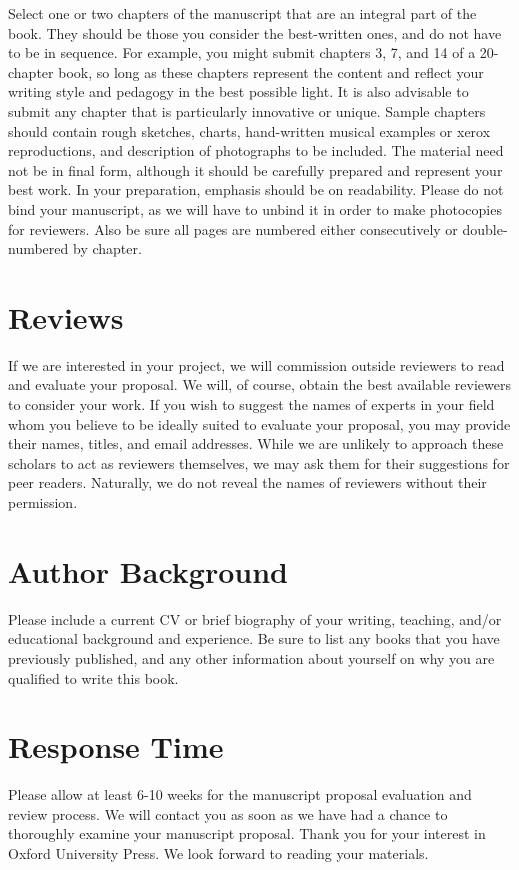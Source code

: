 \documentclass[
  10pt,
  dvipsnames,enabledeprecatedfontcommands]{scrartcl}
\begin{document}
Select one or two chapters of the manuscript that are an integral part
of the book. They should be those you consider the best-written ones,
and do not have to be in sequence. For example, you might submit
chapters 3, 7, and 14 of a 20-chapter book, so long as these chapters
represent the content and reflect your writing style and pedagogy in the
best possible light. It is also advisable to submit any chapter that is
particularly innovative or unique. Sample chapters should contain rough
sketches, charts, hand-written musical examples or xerox reproductions,
and description of photographs to be included. The material need not be
in final form, although it should be carefully prepared and represent
your best work. In your preparation, emphasis should be on readability.
Please do not bind your manuscript, as we will have to unbind it in
order to make photocopies for reviewers. Also be sure all pages are
numbered either consecutively or double-numbered by chapter.

\hypertarget{reviews}{%
\section{Reviews}\label{reviews}}

If we are interested in your project, we will commission outside
reviewers to read and evaluate your proposal. We will, of course, obtain
the best available reviewers to consider your work. If you wish to
suggest the names of experts in your field whom you believe to be
ideally suited to evaluate your proposal, you may provide their names,
titles, and email addresses. While we are unlikely to approach these
scholars to act as reviewers themselves, we may ask them for their
suggestions for peer readers. Naturally, we do not reveal the names of
reviewers without their permission.

\hypertarget{author-background}{%
\section{Author Background}\label{author-background}}

Please include a current CV or brief biography of your writing,
teaching, and/or educational background and experience. Be sure to list
any books that you have previously published, and any other information
about yourself on why you are qualified to write this book.

\hypertarget{response-time}{%
\section{Response Time}\label{response-time}}

Please allow at least 6-10 weeks for the manuscript proposal evaluation
and review process. We will contact you as soon as we have had a chance
to thoroughly examine your manuscript proposal. Thank you for your
interest in Oxford University Press. We look forward to reading your
materials.
\end{document}
